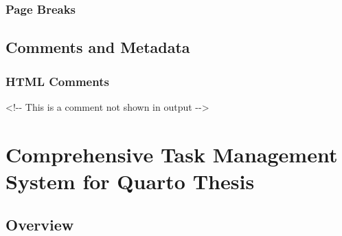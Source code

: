 \documentclass[
  11pt,
  letterpaper,
]{book}
\newenvironment{Shaded}{\begin{snugshade}}{\end{snugshade}}
\newcommand{\CommentTok}[1]{\textcolor[rgb]{0.37,0.37,0.37}{#1}}
\begin{document}
\subsection*{Page Breaks}\label{page-breaks}

\begin{Shaded}
\begin{Highlighting}[]

\end{Highlighting}
\end{Shaded}

\section*{Comments and Metadata}\label{comments-and-metadata}


\subsection*{HTML Comments}\label{html-comments}

\begin{Shaded}
\begin{Highlighting}[]
\CommentTok{\textless{}!{-}{-} This is a comment not shown in output {-}{-}\textgreater{}}
\end{Highlighting}
\end{Shaded}


\chapter*{Comprehensive Task Management System for Quarto
Thesis}\label{comprehensive-task-management-system-for-quarto-thesis}


\section*{Overview}\label{overview}

\end{document}
